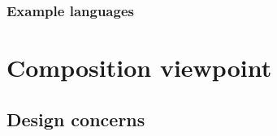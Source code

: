 			\subsubsection{Example languages} \label{s:template-vpv:example-languages}
				\begin{comment}
					Any black-box type diagrams can be used to realize the Context viewpoint. Appropriate languages include
					Structured Analysis [e.g., IDEF0 (IEEE Std 1320.1-1998 [B18]), Structured Analysis and Design 
					Technique (SADT) (Ross [B32]) or those of the DeMarco or Gane-Sarson variety], the Cleanroom’s black
					box diagrams, and UML use cases (OMG [B28]).
				\end{comment}
			
			
	\section{Composition viewpoint} \label{s:tempalte-vpv:composition-viewpoint}
		\begin{comment}
			The Composition viewpoint describes the way the design subject is (recursively) structured into constituent
			parts and establishes the roles of those parts.
		\end{comment}
		
		\subsection{Design concerns} \label{s:tempalte-vpv:design-concerns}
			\begin{comment}
				Software developers and maintainers use this viewpoint to identify the major design constituents of the
				design subject, to localize and allocate functionality, responsibilities, or other design roles to these
				constituents. In maintenance, it can be used to conduct impact analysis and localize the efforts of making
				changes. Reuse, on the level of existing subsystems and large-grained components, can be addressed as
				well. The information in a Composition view can be used by acquisition management and in project
				management for specification and assignment of work packages, and for planning, monitoring, and control
				of a software project. This information, together with other project information, can be used in estimating
				cost, staffing, and schedule for the development effort. Configuration management may use the information
				to establish the organization, tracking, and change management of emerging work products (see
				IEEE Std 12207-2008 [B21]).
			\end{comment}
			
